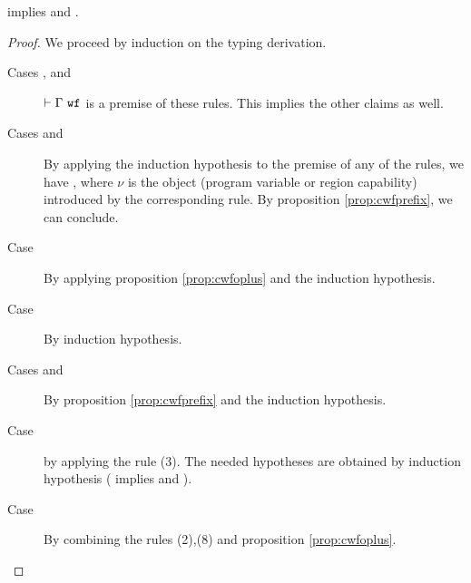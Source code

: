 \documentclass[a4paper]{article}
\begin{document}
\begin{prop}
   implies \cwf{\Gamma} and \ctwf{\Gamma}{\tau,\varepsilon}.
\end{prop}
\begin{proof}
  We proceed by induction on the typing derivation. 
  \begin{description}

    \item[Cases \varrule, \conrule{} and \locrule] ${\normalfont \vdash \Gamma\ \texttt{wf}}$ is a premise of
      these rules. This implies the other claims as well.

    \item[Cases \absrule{} and \absregrule] By applying the induction
      hypothesis to the pre\-mise of any of the rules, we have \cwf{\Gamma, \nu},
      where $\nu$ is the object (program variable or region capability)
      introduced by the corresponding rule. By proposition
      \ref{prop:cwfprefix}, we can conclude.

    \item[Case \apprule] By applying proposition \ref{prop:cwfoplus} and the
      induction hypothesis.

    \item[Case \subeffrule] By induction hypothesis.

    \item[Cases  and \regionrule] By proposition
      \ref{prop:cwfprefix} and the induction hypothesis.

    \item[Case \appregrule] by applying the rule (3). The needed hypotheses
      are obtained by induction hypothesis ( implies \cwf{\Gamma} and
      ).

    \item[Case ] By combining the rules (2),(8) and proposition
      \ref{prop:cwfoplus}.

  \end{description}
\end{proof}
\end{document}
